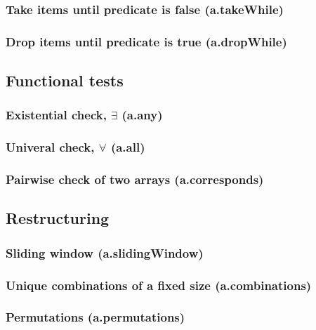 \documentclass{article}
\theoremstyle{definition}
\begin{document}
\subsubsection{Take items until predicate is false (a.takeWhile)}

\subsubsection{Drop items until predicate is true (a.dropWhile)}

\subsection{Functional tests}

\subsubsection{Existential check, $\exists$ (a.any)}

\subsubsection{Univeral check, $\forall$ (a.all)}

\subsubsection{Pairwise check of two arrays (a.corresponds)}

\subsection{Restructuring}

\subsubsection{Sliding window (a.slidingWindow)}

\subsubsection{Unique combinations of a fixed size (a.combinations)}

\subsubsection{Permutations (a.permutations)}
\end{document}
